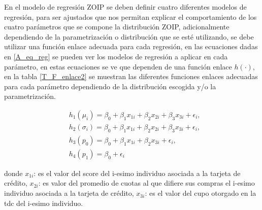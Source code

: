 En el modelo de regresi\'{o}n ZOIP se deben definir cuatro diferentes modelos de regresi\'{o}n, para ser ajustados que nos permitan explicar el comportamiento de los cuatro par\'{a}metros que se compone la distribuci\'{o}n ZOIP, adicionalmente dependiendo de la parametrizaci\'{o}n o distribuci\'{o}n que se est\'{e} utilizando, se debe utilizar una funci\'{o}n enlace adecuada para cada regresi\'{o}n, en las ecuaciones dadas en \eqref{A_eq_reg} se pueden ver los modelos de regresi\'{o}n a aplicar en cada par\'{a}metro, en estas ecuaciones se ve que dependen de una funci\'{o}n enlace $h(\cdot)$, en la tabla \ref{T_F_enlace2} se muestran las diferentes funciones enlaces adecuadas para cada par\'{a}metro dependiendo de la distribuci\'{o}n escogida y/o la parametrizaci\'{o}n.

\begin{equation}
\begin{split}
&h_1(\mu_{i})=\beta_0+\beta_1 x_{1i}+\beta_2 x_{2i}+\beta_3 x_{3i}+\epsilon_i,\\
&h_2(\sigma_{i})=\beta_0+\beta_1 x_{1i}+\beta_2 x_{2i}+\beta_3 x_{3i}+\epsilon_i,\\
&h_3(p_0)=\beta_0+\beta_1 x_{1i}+\beta_2 x_{3i}+\epsilon_i,\\
&h_4(p_1) =\beta_0+\epsilon_i
\end{split}
\label{A_eq_reg}
\end{equation}

donde $x_{1i}$: es el valor del score del i-esimo individuo asociada a la tarjeta de cr\'{e}dito, $x_{2i}$: es valor del promedio de cuotas al que difiere sus compras el i-esimo individuo asociada a la tarjeta de cr\'{e}dito, $x_{3i}$: es el valor del cupo otorgado en la tdc del i-esimo individuo. 

